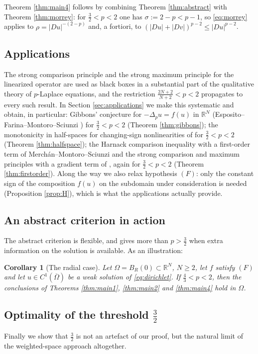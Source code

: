 \documentclass[reqno]{amsart}
\theoremstyle{plain}
\newtheorem{corollary}[theorem]{Corollary}
\theoremstyle{definition}
\theoremstyle{remark}
\newcommand{\R}{\mathbb{R}}
\begin{document}
Theorem \ref{thm:main4} follows by combining Theorem \ref{thm:abstract} with Theorem
\ref{thm:morrey}: for $\frac32<p<2$ one has $\sigma:=2-p<p-1$, so \eqref{eq:morrey} applies to
$\rho=|Du|^{-(2-p)}$ and, a fortiori, to $(|Du|+|Dv|)^{p-2}\le|Du|^{p-2}$.

\subsection{Applications}
The strong comparison principle and the strong maximum principle for the linearized operator are
used as black boxes in a substantial part of the qualitative theory of $p$-Laplace equations, and
the restriction $\frac{2N+2}{N+2}<p<2$ propagates to every such result. In Section
\ref{sec:applications} we make this systematic and obtain, in particular: Gibbons' conjecture for
$-\Delta_pu=f(u)$ in $\R^N$ (Esposito--Farina--Montoro--Sciunzi \cite{EFMS1}) for
$\frac32<p<2$ (Theorem \ref{thm:gibbons}); the monotonicity in half-spaces for changing-sign
nonlinearities of \cite{EFMS2} for $\frac32<p<2$ (Theorem \ref{thm:halfspace}); the Harnack
comparison inequality with a first-order term of Merch\'an--Montoro--Sciunzi \cite{MMS} and the
strong comparison and maximum principles with a gradient term of \cite{Le}, again for
$\frac32<p<2$ (Theorem \ref{thm:firstorder}). Along the way we
also relax hypothesis $(F)$: only the constant sign of the composition $f(u)$ on the subdomain
under consideration is needed (Proposition \ref{prop:H}), which is what the applications actually
provide.

\subsection{An abstract criterion in action}
The abstract criterion is flexible, and gives more than $p>\frac32$ when extra information on the
solution is available. As an illustration:

\begin{corollary}[The radial case]\label{cor:ball}
Let $\Omega=B_R(0)\subset\R^N$, $N\ge2$, let $f$ satisfy $(F)$ and let $u\in C^1(\overline\Omega)$ be
a weak solution of \eqref{eq:dirichlet}. If $\frac43<p<2$, then the conclusions of Theorems \ref{thm:main1}, \ref{thm:main2} and
\ref{thm:main4} hold in $\Omega$.
\end{corollary}

\subsection{Optimality of the threshold \texorpdfstring{$\frac32$}{3/2}}
Finally we show that $\frac32$ is not an artefact of our proof, but the natural limit of the
weighted-space approach altogether.
\end{document}
